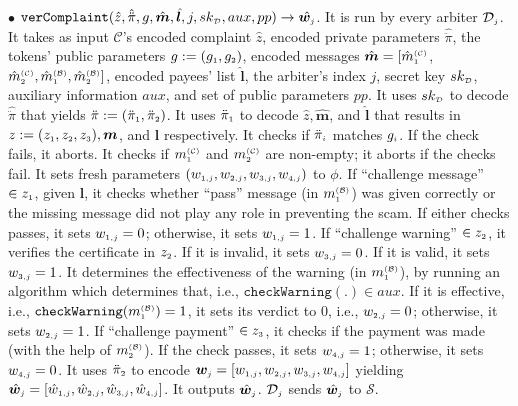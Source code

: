 \begin{definition}
%
\vspace{2mm}
\item  [$\bullet$] $\mathtt{verComplaint}( \hat z, \hat{\ddot{\pi}}, g, \hat{\bm m}, \hat{\bm{l}}, j, sk_{\scriptscriptstyle\mathcal D}, aux, pp)\rightarrow \hat{\bm{w}_{\scriptscriptstyle j}}$. It is run by every arbiter $\mathcal{D}_{\scriptscriptstyle  j}$. It takes as input  $\mathcal{C}$'s encoded complaint $\hat z$,  encoded private parameters $\hat{\ddot{\pi}}$,  the tokens' public parameters $g:=(g_{\scriptscriptstyle 1}, g_{\scriptscriptstyle 2})$,  encoded  messages $\hat{\bm m}=[\hat{m}_{\scriptscriptstyle 1}^{\scriptscriptstyle(\mathcal C)}$, $\hat{m}_{\scriptscriptstyle 2}^{\scriptscriptstyle(\mathcal C)}, \hat{m}_{\scriptscriptstyle 1}^{\scriptscriptstyle(\mathcal B)}, \hat{m}_{\scriptscriptstyle 2}^{\scriptscriptstyle(\mathcal B)}]$, encoded payees' list $ \hat{\bm{l}}$,  the  arbiter's index $j$, secret key $sk_{\scriptscriptstyle\mathcal D}$,   auxiliary information $aux$, and set of public parameters $pp$.  It uses $sk_{\scriptscriptstyle\mathcal D}$ to decode $\hat{\ddot{\pi}}$ that yields  $\ddot{\pi}:=(\ddot{\pi}_{\scriptscriptstyle 1}, \ddot{\pi}_{\scriptscriptstyle 2})$. It uses $\ddot{\pi}_{\scriptscriptstyle 1}$ to decode  $\hat z,  \hat{\bm{m}}$, and  $\hat{\bm{l}}$ that results in $z:=(z_{\scriptscriptstyle 1}, z_{\scriptscriptstyle 2}, z_{\scriptscriptstyle 3}), {\bm m}$, and  ${\bm{l}}$ respectively.  It checks if $\ddot{\pi}_{\scriptscriptstyle i}$ matches  $g_{\scriptscriptstyle i}$. If the check fails, it aborts.  It  checks  if ${m}_{\scriptscriptstyle 1}^{\scriptscriptstyle(\mathcal C)}$ and ${m}_{\scriptscriptstyle 2}^{\scriptscriptstyle(\mathcal C)}$ are non-empty; it aborts if the checks fail. It  sets  fresh parameters $(w_{\scriptscriptstyle 1,j}, w_{\scriptscriptstyle 2,j},  w_{\scriptscriptstyle 3,j},   w_{\scriptscriptstyle 4,j})$ to $\phi$. If ``challenge message'' $\in z_{\scriptscriptstyle 1}$, given $\bm l$,  it checks whether  ``pass''  message (in ${m}^{\scriptscriptstyle\mathcal{(B)}}_{\scriptscriptstyle1}$) was given correctly or the missing message did not play any role in preventing the scam.  If either checks passes, it sets  $w_{\scriptscriptstyle 1,j}=0$;  otherwise,  it sets $w_{\scriptscriptstyle 1,j}=1$. If ``challenge warning'' $\in z_{\scriptscriptstyle 2}$,   it verifies  the certificate in $z_{\scriptscriptstyle 2}$.  If it is invalid,  it sets $ w_{\scriptscriptstyle 3,j}=0$.  If it is valid, it sets  $w_{\scriptscriptstyle 3,j}=1$. It  determines the effectiveness of the warning (in ${m}^{\scriptscriptstyle\mathcal{(B)}}_{\scriptscriptstyle1}$), by running an algorithm which  determines that, i.e., $\mathtt{checkWarning}(.)\in aux$. If  it is effective, i.e., $\mathtt{checkWarning}({m}^{\scriptscriptstyle\mathcal{(B)}}_{\scriptscriptstyle1})= 1$,  it sets its verdict to $0$, i.e., $w_{\scriptscriptstyle 2,j}=0$; otherwise, it sets $w_{\scriptscriptstyle 2,j}=1$.  If ``challenge payment'' $\in z_{\scriptscriptstyle 3}$,    it checks if the payment was made (with the help of ${m}_{\scriptscriptstyle 2}^{\scriptscriptstyle(\mathcal B)}$). If the check passes,  it sets $w_{\scriptscriptstyle 4,j}=1$; otherwise, it sets $w_{\scriptscriptstyle 4,j}=0$.  It uses $\ddot \pi_{\scriptscriptstyle 2}$ to encode  $\bm{w}_{\scriptscriptstyle j} = [w_{\scriptscriptstyle 1,j}, w_{\scriptscriptstyle 2, j}, w_{\scriptscriptstyle 3, j}, w_{\scriptscriptstyle 4, j}]$ yielding  $\hat{\bm{w}}_{\scriptscriptstyle j}= [\hat {w}_{\scriptscriptstyle 1,j}, \hat{w}_{\scriptscriptstyle 2, j}, \hat{w}_{\scriptscriptstyle 3, j}, \hat{w}_{\scriptscriptstyle 4, j}]$. It outputs $\hat{\bm{w}}_{\scriptscriptstyle j}$. $\mathcal{D}_{\scriptscriptstyle  j}$ sends $\hat{\bm{w}}_{\scriptscriptstyle j}$ to  $\mathcal{S}$. 

\end{definition}

